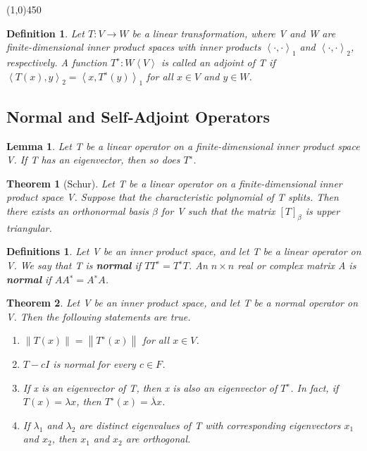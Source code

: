 \documentclass{article}
\newcommand{\norm}[1]{\left\lVert#1\right\rVert}
\newcommand{\bd}[1]{\textbf{#1}}
\newcommand{\ip}[1]{\left\langle {#1}\right\rangle} %
\newcommand{\enumalph}[0]{\begin{enumerate}[label=(\alph*)]}
\theoremstyle{plain}
\newtheorem{theorem}{Theorem}[section]
\newtheorem*{lemma}{Lemma}
\newtheorem*{definition1}{Definition}
\newtheorem*{definitions}{Definitions}
\theoremstyle{plain} %
\begin{document}
\begin{center}
  \line(1,0){450}
  \end{center}

\begin{definition1}
  Let $T: V \to W$ be a linear transformation, where V and W are finite-dimensional inner product spaces with inner products $\ip{·, ·}_1$ and $\ip{·, ·}_2$, respectively. A function $T^∗ : W \ip V$ is called an adjoint of T if $\ip{T(x), y}_2 = \ip{x,T^∗(y)}_1$ for all $x \in V$ and $y \in W$.
\end{definition1}

\subsection{Normal and Self-Adjoint Operators}

\begin{lemma}
  Let T be a linear operator on a finite-dimensional inner product space V. If T has an eigenvector, then so does $T^∗$.
\end{lemma}

\begin{theorem}[Schur]
  Let T be a linear operator on a finite-dimensional inner product space V. Suppose that the characteristic polynomial of T splits. Then there exists an orthonormal basis $\beta$ for V such that the matrix $[T]_\beta$ is upper triangular.
\end{theorem}

\begin{definitions}
  Let V be an inner product space, and let T be a linear operator on V. We say that T is \bd{normal} if $TT^∗ = T^∗T$. An $n \times n$ real or complex matrix A is \bd{normal} if $AA^∗ = A^∗A$.
\end{definitions}

\begin{theorem}
  Let V be an inner product space, and let T be a normal operator on V. Then the following statements are true.
\enumalph
  \item $\norm{T(x)} = \norm{T^∗(x)}$ for all $x \in V$.
  \item $T − cI$ is normal for every $c \in F$.
  \item If x is an eigenvector of T, then x is also an eigenvector of $T^∗$. In fact, if $T(x) = \lambda x$, then $T^∗(x) = \overline{\lambda} x$.
  \item If $\lambda_1$ and $\lambda_2$ are distinct eigenvalues of T with corresponding eigenvectors $x_1$ and $x_2$, then $x_1$ and $x_2$ are orthogonal.
\end{enumerate}
\end{theorem}
\end{document}
